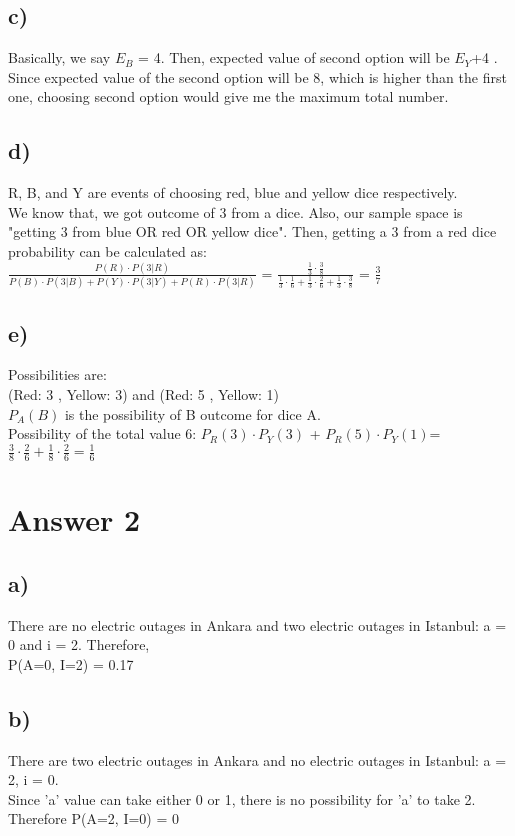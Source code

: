 \documentclass[12pt]{article}
\begin{document}
\subsection*{c)}\noindent 
Basically, we say $E_B$ = 4. Then, expected value of second option will be $E_Y$+4 .
Since expected value of the second option will be 8, which is higher than the first one, choosing second option would give me the maximum total number.

\subsection*{d)}\noindent 
R, B, and Y are events of choosing red, blue and yellow dice respectively.\\
We know that, we got outcome of 3 from a dice. Also, our sample space is "getting 3 from blue OR red OR yellow dice". Then, getting a 3 from a red dice probability can be calculated as:\\
$\frac{P(R)\cdot P(3\vert R)}{P(B)\cdot P(3\vert B)+P(Y)\cdot P(3\vert Y)+P(R)\cdot P(3\vert R)}$ = $\frac{\frac{1}{3}\cdot \frac{3}{8}}{\frac{1}{3}\cdot \frac{1}{6}+\frac{1}{3}\cdot \frac{2}{6}+\frac{1}{3}\cdot \frac{3}{8}}$ = $\frac{3}{7}$

\subsection*{e)}\noindent 
Possibilities are:\\
(Red: 3 , Yellow: 3) and (Red: 5 , Yellow: 1)\\
$P_A(B)$ is the possibility of B outcome for dice A.\\
Possibility of the total value 6: $P_R(3)\cdot P_Y(3)$ + $P_R(5)\cdot P_Y(1)$=$\frac{3}{8}\cdot\frac{2}{6}+\frac{1}{8}\cdot\frac{2}{6}=\frac{1}{6}$\\


\section*{Answer 2}

\subsection*{a)}\noindent 
There are no electric outages in Ankara and two electric outages in Istanbul: a = 0 and i = 2. Therefore, \\
P(A=0, I=2) = 0.17

\subsection*{b)}\noindent 
There are two electric outages in Ankara and no electric outages in Istanbul: a = 2, i = 0.\\
Since 'a' value can take either 0 or 1, there is no possibility for 'a' to take 2. Therefore P(A=2, I=0) = 0
\end{document}
